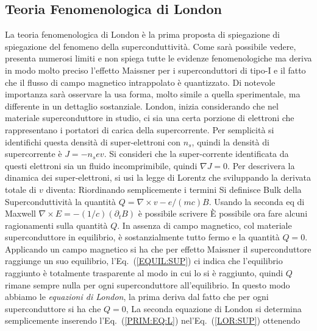 \subsection{Teoria Fenomenologica di London}
La teoria fenomenologica di London \`e la prima proposta di spiegazione di spiegazione del fenomeno della superconduttivit\`a. Come sar\`a possibile vedere, presenta numerosi limiti e non spiega tutte le evidenze fenomenologiche ma deriva in modo molto preciso l'effetto Maissner per i superconduttori di tipo-I e il fatto che il flusso di campo magnetico intrappolato \`e quantizzato. Di notevole importanza sar\`a osservare la usa forma, molto simile a quella sperimentale, ma differente in un dettaglio sostanziale. London, inizia considerando che nel materiale superconduttore in studio, ci sia una certa porzione di elettroni che rappresentano i portatori di carica della supercorrente. Per semplicit\`a si identifichi questa densit\`a di super-elettroni con $n_s$, quindi la densit\`a di supercorrente \`e $J=-n_s e v$.  Si consideri che la super-corrente identificata da questi elettroni sia un fluido incomprimibile, quindi $\nabla J = 0$. Per descrivera la dinamica dei super-elettroni, si usi la legge di Lorentz
che sviluppando la derivata totale di $v$ diventa:
Riordinando semplicemente i termini
Si definisce Bulk della Superconduttivit\`a  la quantit\`a $Q= \nabla \times v -e/(mc)B$. Usando la seconda eq di Maxwell $\nabla \times E = -(1/c) (\partial_t B)$ \`e possibile scrivere
\`E possibile ora fare alcuni ragionamenti sulla quantit\`a $Q$. In assenza di campo magnetico, col materiale superconduttore in equilibrio, \`e sostanzialmente tutto fermo e la quantit\`a $Q=0$. Applicando un campo magnetico si ha che per effetto Maissner il superconduttore raggiunge un suo equilibrio, l'Eq.~(\ref{EQUIL:SUP}) ci indica che l'equilibrio raggiunto \`e totalmente trasparente al modo in cui lo si \`e raggiunto, quindi $Q$ rimane sempre nulla per ogni superconduttore all'equilibrio. In questo modo abbiamo le \textit{equazioni di London}, la prima deriva dal fatto che per ogni superconduttore si ha che $Q=0$,
La seconda equazione di London si determina semplicemente inserendo l'Eq.~(\ref{PRIM:EQ:L}) nel'Eq.~(\ref{LOR:SUP}) ottenendo
